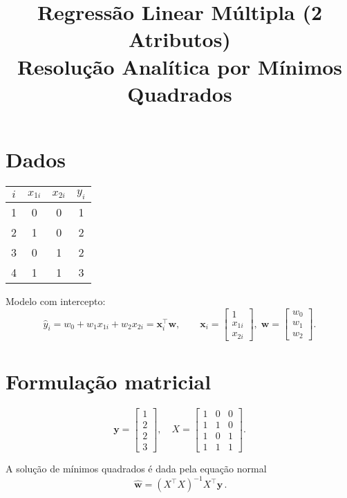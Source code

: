 \documentclass[12pt]{article}
\title{Regressão Linear Múltipla (2 Atributos) \\
Resolução Analítica por Mínimos Quadrados}
\author{}
\date{}
\begin{document}
\maketitle

\section{Dados}

\begin{center}
\begin{tabular}{cccc}
\toprule
$i$ & $x_{1i}$ & $x_{2i}$ & $y_i$\\
\midrule
1 & 0 & 0 & 1\\
2 & 1 & 0 & 2\\
3 & 0 & 1 & 2\\
4 & 1 & 1 & 3\\
\bottomrule
\end{tabular}
\end{center}

\bigskip
Modelo com intercepto:
\[
\hat{y}_i = w_0 + w_1 x_{1i} + w_2 x_{2i}
           = \bm{x}_i^\top \bm{w}, 
\qquad
\bm{x}_i =
\begin{bmatrix}
1 \\ x_{1i} \\ x_{2i}
\end{bmatrix},
\;
\bm{w} =
\begin{bmatrix}
w_0 \\ w_1 \\ w_2
\end{bmatrix}.
\]

\section{Formulação matricial}

\[
\bm{y} =
\begin{bmatrix}
1\\2\\2\\3
\end{bmatrix},
\quad
X =
\begin{bmatrix}
1 & 0 & 0\\
1 & 1 & 0\\
1 & 0 & 1\\
1 & 1 & 1
\end{bmatrix}.
\]

A solução de mínimos quadrados é dada pela equação normal
\[
\boxed{\,
\hat{\bm{w}}
 = (X^{\!\top}X)^{-1} X^{\!\top}\bm{y}\,}.
\]
\end{document}
